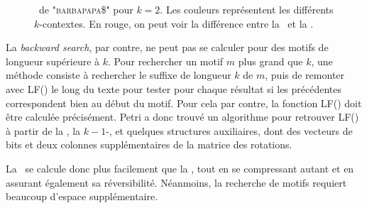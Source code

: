 \begin{figure}
\caption{\kbwt\ de \textsc{"barbapapa\$"} pour $k = 2$. Les couleurs représentent les différents $k$-contextes. En rouge, on peut voir la différence entre la \bwt\ et la \kbwt.}
\label{kbwt}
\end{figure}



La \textit{backward search}, par contre, ne peut pas se calculer pour des motifs de longueur supérieure à $k$. Pour rechercher un motif $m$ plus grand que $k$, une méthode consiste à rechercher le suffixe de longueur $k$ de $m$, puis de remonter avec LF() le long du texte pour tester pour chaque résultat si les précédentes correspondent bien au début du motif. Pour cela par contre, la fonction LF() doit être calculée précisément. Petri a donc trouvé un algorithme pour retrouver LF() à partir de la \kbwt, la $k-1$-\bwt, et quelques structures auxiliaires, dont des vecteurs de bits et deux colonnes supplémentaires de la matrice des rotations.

La \kbwt\ se calcule donc plus facilement que la \bwt, tout en se compressant autant et en assurant également sa réversibilité. Néanmoins, la recherche de motifs requiert beaucoup d'espace supplémentaire.
